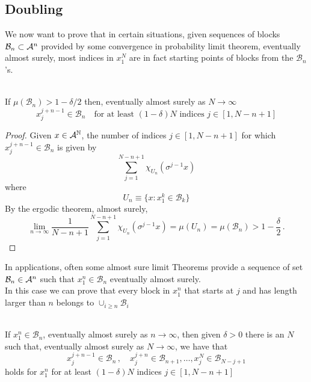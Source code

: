 \subsection{Doubling}
We now want to prove that in certain situations, given sequences of blocks $\mathcal{B}_n \subset \mathcal{A}^n$ provided by some convergence in probability limit theorem, eventually almost surely, most indices in $x_1^N$ are in fact starting points of blocks from the $\mathcal{B}_n$'s.
\begin{lemma}
    \hfill \\
    If $\mu(\mathcal{B}_n) > 1 - \delta/2$ then, eventually almost surely as $N \rightarrow \infty$
    \begin{equation*}
        x_j^{j+n-1} \in \mathcal{B}_n \quad \text{for at least $(1-\delta)N$ indices $j \in [1, N-n+1]$}
    \end{equation*}
\end{lemma}
\begin{proof}
    Given $x \in \mathcal{A}^{\mathbb{N}}$, the number of indices $j \in [1, N-n+1]$ for which $x_j^{j+n-1} \in \mathcal{B}_n$ is given by 
    \begin{equation*}
        \sum_{j=1}^{N-n+1} \chi_{U_n} (\sigma^{j-1} x)
    \end{equation*}
    where 
    \begin{equation*}
        U_n \equiv \{ x : x_1^k \in \mathcal{B}_k \}
    \end{equation*}
    By the ergodic theorem, almost surely,
    \begin{equation*}
        \lim_{n \rightarrow \infty} \frac{1}{N-n+1} \sum_{j=1}^{N-n+1} \chi_{U_n} (\sigma^{j-1} x) = \mu(U_n) = \mu(\mathcal{B}_n) > 1 - \frac{\delta}{2} \, .
    \end{equation*}
\end{proof}
In applications, often some almost sure limit Theorems provide a sequence of set $\mathcal{B}_n \in \mathcal{A}^n$ such that $x_1^n \in \mathcal{B}_n$ eventually almost surely.
\\In this case we can prove that every block in $x_1^n$ that starts at $j$ and has length larger than $n$ belongs to $\cup_{i \geq n} \mathcal{B}_i$
\begin{lemma}
    \hfill \\
    If $x_1^n \in \mathcal{B}_n$, eventually almost surely as $n \rightarrow \infty$, then given $\delta>0$  there is an $N$ such that, eventually almost surely as $N \rightarrow \infty$, we have that
    \begin{equation*}
        x_j^{j+n-1} \in \mathcal{B}_n \, , \quad x_j^{j+n} \in \mathcal{B}_{n+1}, \dots, x_j^N \in \mathcal{B}_{N-j+1}
    \end{equation*}
    holds for $x_1^n$ for at least $(1 - \delta)N$ indices $j \in [1, N-n+1]$
\end{lemma}
